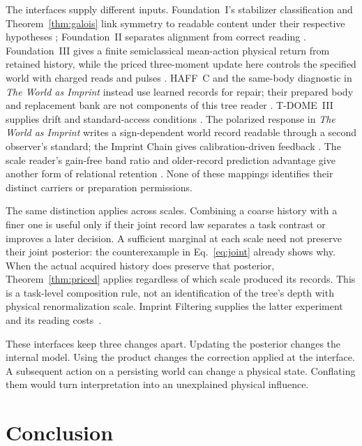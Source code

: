 \documentclass[11pt,a4paper]{article}
\begin{document}
The interfaces supply different inputs. Foundation~I's stabilizer classification and Theorem~\ref{thm:galois} link symmetry to readable content under their respective hypotheses \cite{FoundationI}; Foundation~II separates alignment from correct reading \cite{FoundationII}. Foundation~III gives a finite semiclassical mean-action physical return from retained history, while the priced three-moment update here controls the specified world with charged reads and pulses \cite{FoundationIII}. HAFF~C and the same-body diagnostic in \emph{The World as Imprint} instead use learned records for repair; their prepared body and replacement bank are not components of this tree reader \cite{HAFFC,WorldImprint}. T-DOME~III supplies drift and standard-access conditions \cite{TDOMEIII}. The polarized response in \emph{The World as Imprint} writes a sign-dependent world record readable through a second observer's standard; the Imprint Chain gives calibration-driven feedback \cite{WorldImprint,ImprintChain}. The scale reader's gain-free band ratio and older-record prediction advantage give another form of relational retention \cite{ImprintRG}. None of these mappings identifies their distinct carriers or preparation permissions.

The same distinction applies across scales. Combining a coarse history
with a finer one is useful only if their joint record law separates a
task contrast or improves a later decision. A sufficient marginal at each
scale need not preserve their joint posterior: the counterexample in
Eq.~\eqref{eq:joint} already shows why. When the actual acquired history
does preserve that posterior, Theorem~\ref{thm:priced} applies regardless
of which scale produced its records. This is a task-level composition
rule, not an identification of the tree's depth with physical
renormalization scale. Imprint Filtering supplies the latter experiment
and its reading costs~\cite{ImprintRG}.

These interfaces keep three changes apart. Updating the posterior changes the internal model. Using the product changes the correction applied at the interface. A subsequent action on a persisting world can change a physical state. Conflating them would turn interpretation into an unexplained physical influence.

\section{Conclusion}
\end{document}
